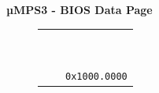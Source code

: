 \documentclass{beamer}
\begin{document}
\begin{frame}
\begin{center}
\begin{minipage}{0.47\textwidth}
\begin{block}{\textbf{{\small µMPS3 - BIOS Data Page}}}
\begin{figure}[h]
\begin{tabular}{rcl}
						\multicolumn{1}{l|}{\multirow{20}{*}{\rotatebox{90}{{\small BIOS region}}}} & \multicolumn{1}{c|}{\cellcolor{nord9}}                                                         &                                               \\
						\multicolumn{1}{l|}{}                                                    & \multicolumn{1}{c|}{\cellcolor{nord9}}                                                         &                                               \\
						\multicolumn{1}{l|}{}                                                    & \multicolumn{1}{c|}{\cellcolor{nord9}}                                                         &                                               \\
						\multicolumn{1}{l|}{}                                                    & \multicolumn{1}{c|}{\cellcolor{nord9}}                                                         &                                               \\
						\multicolumn{1}{l|}{}                                                    & \multicolumn{1}{c|}{\cellcolor{nord9}}                                                         &                                               \\
						\multicolumn{1}{l|}{}                                                    & \multicolumn{1}{c|}{\cellcolor{nord9}}                                                         &                                               \\
						\multicolumn{1}{l|}{}                                                    & \multicolumn{1}{c|}{\cellcolor{nord9}}                                                         &                                               \\
						\multicolumn{1}{l|}{}                                                    & \multicolumn{1}{c|}{\cellcolor{nord9}}                                                         &                                               \\
						\multicolumn{1}{l|}{}                                                    & \multicolumn{1}{c|}{\cellcolor{nord9}}                                                         &                                               \\
						\multicolumn{1}{l|}{}                                                    & \multicolumn{1}{c|}{\cellcolor{nord9}}                                                         & \multirow{2}{*}{\texttt{{\tiny 0x1000.0000}}} \\ \hhline{~-~}

\end{tabular}
\end{figure}
\end{block}
\end{minipage}
\end{center}
\end{frame}
\end{document}
